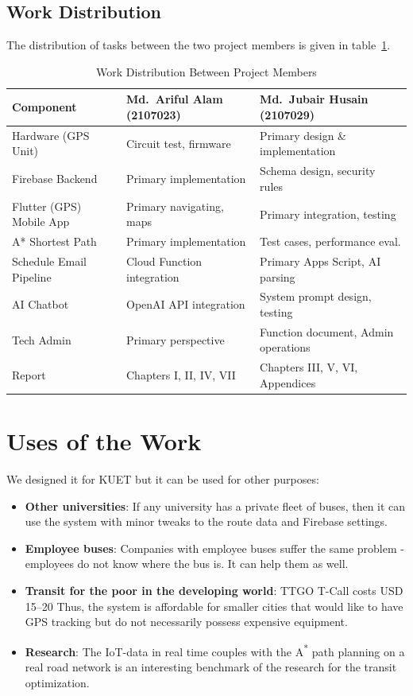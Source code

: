 \documentclass[12pt,a4paper]{report}
\begin{document}
\subsection{Work Distribution}

The distribution of tasks between the two project members is given in table~\ref{tab:workdist}.

\begin{table}[t]
	\caption{Work Distribution Between Project Members}
	\label{tab:workdist}
	\centering
	\begin{tabularx}{\linewidth}{lXX}
		\toprule
		\textbf{Component} & \textbf{Md.\ Ariful Alam (2107023)} & \textbf{Md.\ Jubair Husain (2107029)}\\
		\midrule
		Hardware (GPS Unit)         & Circuit test, firmware & Primary design \& implementation \\
		Firebase Backend            & Primary implementation & Schema design, security rules \\
		Flutter (GPS) Mobile App    & Primary navigating, maps & Primary integration, testing \\
		A* Shortest Path            & Primary implementation & Test cases, performance eval. \\
		Schedule Email Pipeline     & Cloud Function integration & Primary Apps Script, AI parsing \\
		AI Chatbot                  & OpenAI API integration & System prompt design, testing \\
		Tech Admin                  & Primary perspective & Function document, Admin operations \\
		Report                      & Chapters I, II, IV, VII & Chapters III, V, VI, Appendices \\
		\bottomrule
	\end{tabularx}
\end{table}

\section{Uses of the Work}

We designed it for KUET but it can be used for other purposes:

\begin{itemize}[leftmargin=*]
	\item \textbf{Other universities}: If any university has a private fleet of buses, then it can use the system with minor tweaks to the route data and Firebase settings.
	\item \textbf{Employee buses}: Companies with employee buses suffer the same problem - employees do not know where the bus is. It can help them as well.
	\item \textbf{Transit for the poor in the developing world}: TTGO T-Call costs USD 15--20 Thus, the system is affordable for smaller cities that would like to have GPS tracking but do not necessarily possess expensive equipment.
	\item \textbf{Research}: The IoT-data in real time couples with the A\textsuperscript{*} path planning on a real road network is an interesting benchmark of the research for the transit optimization.
\end{itemize}
\end{document}
